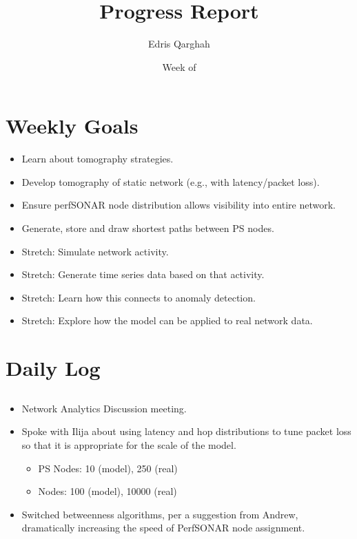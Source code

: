 \documentclass{weeklyreport}
\title{Progress Report}
\author{Edris Qarghah}
\date{Week of \DTMusedate{reportdate}}
\begin{document}
\maketitle

\newpage

\section*{Weekly Goals}


\begin{itemize}
	\item Learn about tomography strategies.
	\item Develop tomography of static network (e.g., with latency/packet loss).
	\item Ensure perfSONAR node distribution allows visibility into entire network.
	\item Generate, store and draw shortest paths between PS nodes.
	\item Stretch: Simulate network activity.
	\item Stretch: Generate time series data based on that activity.
	\item Stretch: Learn how this connects to anomaly detection.
	\item Stretch: Explore how the model can be applied to real network data.
\end{itemize}

\section*{Daily Log}

\subsection*{}

\begin{itemize}
    \item Network Analytics Discussion meeting.
    \item Spoke with Ilija about using latency and hop distributions to tune packet loss so that it is appropriate for the scale of the model.
    \begin{itemize}
    	\item PS Nodes: 10 (model), 250 (real)
    	\item Nodes: 100 (model), 10000 (real)
    \end{itemize}
    \item Switched betweenness algorithms, per a suggestion from Andrew, dramatically increasing the speed of PerfSONAR node assignment.
\end{itemize}
\end{document}
